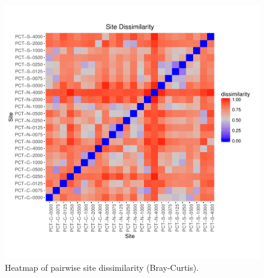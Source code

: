 \documentclass[11pt,letterpaper]{article} %
\begin{document}
{\begin{figure}[h!] %
  \centering
    \includegraphics[width=1\textwidth]{../../Figures/heatmap_sites.pdf}
    \caption{Heatmap of pairwise site dissimilarity (Bray-Curtis).}
  \label{heatmap} %
\end{figure}



}
\end{document}

